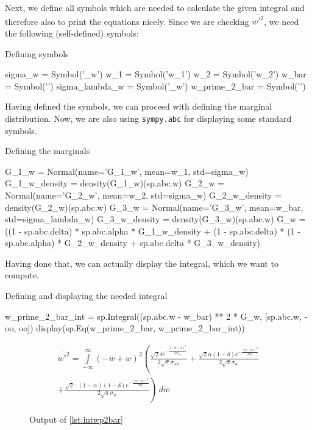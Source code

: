 \noindent
Next, we define all symbols which are needed to calculate the given integral and therefore also to print the equations nicely.
Since we are checking $\overline{w'^2}$, we need the following (self-defined) symbols:
\begin{listing}[!ht]
    \caption{Defining symbols}
    \label{lst:defsymb}
    \begin{pythoncode}
        sigma_w = Symbol('\sigma_w')
        w_1 = Symbol('w_1')
        w_2 = Symbol('w_2')
        w_bar = Symbol('')
        sigma_lambda_w = Symbol('\sigma_{\lambda w}')
        w_prime_2_bar = Symbol('')
    \end{pythoncode}
\end{listing}
Having defined the symbols, we can proceed with defining the marginal distribution.
Now, we are also using \texttt{sympy.abc} for displaying some standard symbols.
\begin{listing}[!ht]
    \caption{Defining the marginals}
    \label{lst:defmarginals}
    \begin{pythoncode}
        G_1_w = Normal(name='G_1_w', mean=w_1, std=sigma_w)
        G_1_w_density = density(G_1_w)(sp.abc.w)
        G_2_w = Normal(name='G_2_w', mean=w_2, std=sigma_w)
        G_2_w_density = density(G_2_w)(sp.abc.w)
        G_3_w = Normal(name='G_3_w', mean=w_bar, std=sigma_lambda_w)
        G_3_w_density = density(G_3_w)(sp.abc.w)
        G_w = ((1 - sp.abc.delta) * sp.abc.alpha * G_1_w_density +
               (1 - sp.abc.delta) * (1 - sp.abc.alpha) * G_2_w_density +
               sp.abc.delta * G_3_w_density)
    \end{pythoncode}
\end{listing}
Having done that, we can actually display the integral, which we want to compute.
\begin{listing}[!ht]
    \caption{Defining and displaying the needed integral}
    \label{lst:intwp2bar}
    \begin{pythoncode}
        w_prime_2_bar_int = sp.Integral((sp.abc.w - w_bar) ** 2 * G_w, [sp.abc.w, -oo, oo])
        display(sp.Eq(w_prime_2_bar, w_prime_2_bar_int))
    \end{pythoncode}
\end{listing}
\begin{figure}[!ht]
    \centering
    \caption{Output of \cref{lst:intwp2bar}}
    \label{fig:intwp2barout}
    \begin{align}
        \overline{w'^2}
        = \int\limits_{-\infty}^{\infty}
        \left(- \overline{w} + w\right)^{2}
        \left(\frac{\sqrt{2} \delta e^{- \frac{\left(- \overline{w} + w\right)^{2}}{2 \sigma_{\lambda w}^{2}}}}{2 \sqrt{\pi} \sigma_{\lambda w}}
        + \frac{\sqrt{2} \alpha \left(1 - \delta\right) e^{- \frac{\left(w - w_{1}\right)^{2}}{2 \sigma_{w}^{2}}}}{2 \sqrt{\pi} \sigma_{w}}\right. \nonumber\\
        + \left.\frac{\sqrt{2} \cdot \left(1 - \alpha\right) \left(1 - \delta\right) e^{- \frac{\left(w - w_{2}\right)^{2}}{2 \sigma_{w}^{2}}}}{2 \sqrt{\pi} \sigma_{w}}\right)
        \, dw \nonumber
    \end{align}
\end{figure}
